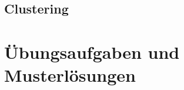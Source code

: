 \documentclass[a4paper]{article}
\begin{document}
\begin{landscape}
\begin{multicols}{3}
    \section{Clustering}
    
    
    \end{multicols}


    \newpage


    \section{Übungsaufgaben und Musterlösungen}
\end{landscape}
\end{document}
